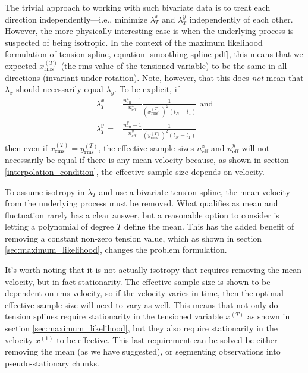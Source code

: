 \documentclass[10pt,journal]{IEEEtran}
\begin{document}
The trivial approach to working with such bivariate data is to treat each direction independently---i.e., minimize $\lambda^x_T$ and $\lambda^y_T$ independently of each other. However, the more physically interesting case is when the underlying process is suspected of being isotropic. In the context of the maximum likelihood formulation of tension spline, equation \ref{smoothing-spline-pdf}, this means that we expected $x^{(T)}_{\textrm{rms}}$ (the rms value of the tensioned variable) to be the same in all directions (invariant under rotation). Note, however, that this does \emph{not} mean that $\lambda_x$ should necessarily equal $\lambda_y$. To be explicit, if 
\begin{align}
\label{lambda_x}
\lambda^x_T =& \frac{n^x_{\textrm{eff}}-1}{n^x_{\textrm{eff}}} \frac{1}{ \left(x^{(T)}_{\textrm{rms}}\right)^2 (t_N-t_1)} \textrm{ and}\\
\lambda^y_T =& \frac{n^y_{\textrm{eff}}-1}{n^y_{\textrm{eff}}} \frac{1}{ \left(y^{(T)}_{\textrm{rms}}\right)^2 (t_N-t_1)}
\end{align}
then even if $x^{(T)}_{\textrm{rms}} = y^{(T)}_{\textrm{rms}}$, the effective sample sizes $n^x_{\textrm{eff}}$ and $n^y_{\textrm{eff}}$ will not necessarily be equal if there is any mean velocity because, as shown in section \ref{interpolation_condition}, the effective sample size depends on velocity.

To assume isotropy in $\lambda_T$ and use a bivariate tension spline, the mean velocity from the underlying process must be removed. What qualifies as mean and fluctuation rarely has a clear answer, but a reasonable option to consider is letting a polynomial of degree $T$ define the mean. This has the added benefit of removing a constant non-zero tension value, which as shown in section \ref{sec:maximum_likelihood}, changes the problem formulation. 

It's worth noting that it is not actually isotropy that requires removing the mean velocity, but in fact stationarity. The effective sample size is shown to be dependent on rms velocity, so if the velocity varies in time, then the optimal effective sample size will need to vary as well. This means that not only do tension splines require stationarity in the tensioned variable $x^{(T)}$ as shown in section \ref{sec:maximum_likelihood}, but they also require stationarity in the velocity $x^{(1)}$ to be effective. This last requirement can be solved be either removing the mean (as we have suggested), or segmenting observations into pseudo-stationary chunks.
\end{document}
